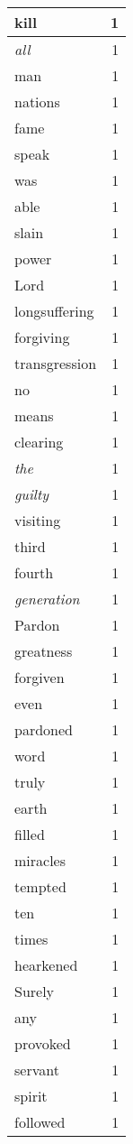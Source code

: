 \begin{center}
\begin{longtable}{l|r}
kill & 1 \\ \hline
\emph{all} & 1 \\ \hline
man & 1 \\ \hline
nations & 1 \\ \hline
fame & 1 \\ \hline
speak & 1 \\ \hline
was & 1 \\ \hline
able & 1 \\ \hline
slain & 1 \\ \hline
power & 1 \\ \hline
Lord & 1 \\ \hline
longsuffering & 1 \\ \hline
forgiving & 1 \\ \hline
transgression & 1 \\ \hline
no & 1 \\ \hline
means & 1 \\ \hline
clearing & 1 \\ \hline
\emph{the} & 1 \\ \hline
\emph{guilty} & 1 \\ \hline
visiting & 1 \\ \hline
third & 1 \\ \hline
fourth & 1 \\ \hline
\emph{generation} & 1 \\ \hline
Pardon & 1 \\ \hline
greatness & 1 \\ \hline
forgiven & 1 \\ \hline
even & 1 \\ \hline
pardoned & 1 \\ \hline
word & 1 \\ \hline
truly & 1 \\ \hline
earth & 1 \\ \hline
filled & 1 \\ \hline
miracles & 1 \\ \hline
tempted & 1 \\ \hline
ten & 1 \\ \hline
times & 1 \\ \hline
hearkened & 1 \\ \hline
Surely & 1 \\ \hline
any & 1 \\ \hline
provoked & 1 \\ \hline
servant & 1 \\ \hline
spirit & 1 \\ \hline
followed & 1 \\ \hline

\end{longtable}
\end{center}
